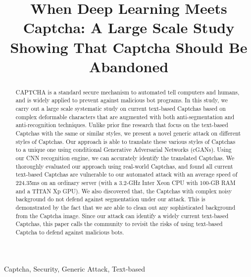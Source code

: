 \documentclass[10pt,conference]{IEEEtran}
\begin{document}

\title{When Deep Learning Meets Captcha: A Large Scale Study Showing That Captcha Should Be Abandoned}
\author{
}

\IEEEoverridecommandlockouts \makeatletter{}\makeatother \IEEEpubid{\parbox{\columnwidth}{ }
\hspace{\columnsep}\makebox[\columnwidth]{}}

\maketitle

\begin{abstract}
CAPTCHA is a standard secure mechanism to automated tell computers and humans, and is widely applied to prevent against malicious bot programs. In this study, we carry out a large scale systematic study on current text-based Captchas based on complex deformable characters that are augmented with both anti-segmentation and anti-recognition techniques. Unlike prior fine research that focus on the text-based Captchas with the same or similar styles, we present a novel generic attack on different styles of Captchas. Our approach is able to translate these various styles of Captchas to a unique one using conditional Generative Adversarial Networks (cGANs). Using our CNN recognition engine, we can accurately identify the translated Captchas. We thoroughly evaluated our approach using real-world Captchas, and found all current text-based Captchas are vulnerable to our automated attack with an average speed of 224.35ms on an ordinary server (with a 3.2-GHz Inter Xeon CPU with 100-GB RAM and a TITAN Xp GPU). We also discovered that, the Captchas with complex noisy background do not defend against segmentation under our attack. This is demonstrated by the fact that we are able to clean out any sophisticated background from the Captcha image. Since our attack can identify a widely current text-based Captchas, this paper calls the community to revisit the risks of using text-based Captcha to defend against malicious bots.
\end{abstract}

\begin{IEEEkeywords}
    Captcha, Security, Generic Attack, Text-based
\end{IEEEkeywords}











%
%
\end{document}
